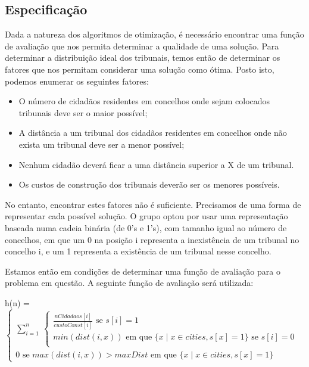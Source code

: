 \documentclass[11pt,a4paper,reqno]{article}
\numberwithin{equation}{section}
\begin{document}
\subsection{Especificação} \label{introduction}

Dada a natureza dos algoritmos de otimização, é necessário encontrar uma função de avaliação que nos permita determinar a qualidade de uma solução. Para determinar a distribuição ideal dos tribunais, temos então de determinar os fatores que nos permitam considerar uma solução como ótima. Posto isto, podemos enumerar os seguintes fatores:

\begin{itemize}
\item O número de cidadãos residentes em concelhos onde sejam colocados tribunais deve ser o maior possível;
\item A distância a um tribunal dos cidadãos residentes em concelhos onde não exista um tribunal deve ser a menor possível;
\item Nenhum cidadão deverá ficar a uma distância superior a X de um tribunal.
\item Os custos de construção dos tribunais deverão ser os menores possíveis.
\end{itemize}

No entanto, encontrar estes fatores não é suficiente. Precisamos de uma forma de representar cada possível solução. O grupo optou por usar uma representação baseada numa cadeia binária (de 0's e 1's), com tamanho igual ao número de concelhos, em que um 0 na posição i representa a inexistência de um tribunal no concelho i, e um 1 representa a existência de um tribunal nesse concelho.

Estamos então em condições de determinar uma função de avaliação para o problema em questão. A seguinte função de avaliação será utilizada:

h(n) = $\begin{cases} 
    \sum\limits_{i=1}^{n}\
	\begin{cases} 
		\frac {nCidadaos[i]}{custoConst[i]} \mbox{ se } s[i] = 1\\
		min(dist(i,x)) \mbox{ em que }  \{ x \mid x \in cities, s[x] = 1 \} \mbox{ se } s[i] = 0\\
	\end{cases}\\
	0 \mbox{ se } max(dist(i,x)) > maxDist \mbox{ em que } \{ x \mid x \in cities, s[x] = 1 \}
	\end{cases}$\\
	
\end{document}

